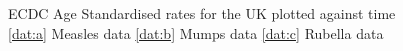 \documentclass{article}
\theoremstyle{definition}
\begin{document}
\begin{figure}
  \centering
  \par
  \centering
  \par
  \centering
  \caption{ECDC Age Standardised rates for the UK plotted against time \ref{dat:a} Measles data \ref{dat:b} Mumps data \ref{dat:c} Rubella data}
  \label{fig:dat}
\end{figure}
\newpage
\printbibliography  
\end{document}
